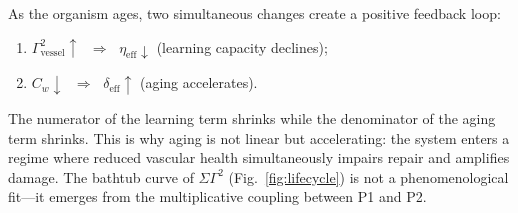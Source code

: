 \documentclass[aps,pre,twocolumn,superscriptaddress,floatfix]{revtex4-2}
\begin{document}
\begin{remark}
\label{rem:aging-feedback}
As the organism ages, two simultaneous changes create
a positive feedback loop:
\begin{enumerate}
  \item $\Gamma^2_{\text{vessel}} \uparrow$
    $\;\Rightarrow\;$ $\eta_{\text{eff}} \downarrow$
    (learning capacity declines);
  \item $C_w \downarrow$
    $\;\Rightarrow\;$ $\delta_{\text{eff}} \uparrow$
    (aging accelerates).
\end{enumerate}
The numerator of the learning term shrinks while
the denominator of the aging term shrinks.
This is why aging is not linear but accelerating:
the system enters a regime where reduced vascular
health simultaneously impairs repair and amplifies
damage.  The bathtub curve of $\Sigma\Gamma^2$
(Fig.~\ref{fig:lifecycle}) is not a phenomenological
fit---it emerges from the multiplicative coupling
between P1 and P2.
\end{remark}
\end{document}
